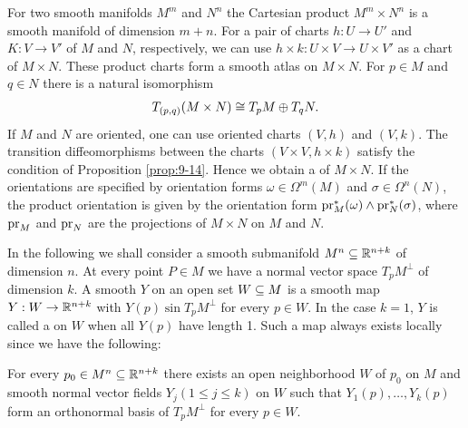 \begin{remark}\label{remark:9-20}
  For two smooth manifolds $M^m$ and $N^n$ the Cartesian product $M^m\times N^n$ is a smooth 
  manifold of dimension $m+n$. For a pair of charts $h:U\to U'$
  and $K:V\to V'$ of $M$ and $N$, respectively, we can use $h\times k:U\times V\to U\times V'$
  as a chart of $M\times N$. These product charts form a smooth atlas on $M\times N$. For
  $p\in M$ and $q\in N$ there is a natural isomorphism  
  \begin{align*}
    T_{(p, q)}(M\times N) \cong T_pM \oplus T_qN.
  \end{align*}
  If $M$ and $N$ are oriented, one can use oriented charts $(V, h)$ and $(V, k)$. The transition 
  diffeomorphisms between the charts $(V\times V , h\times k)$ satisfy the condition
  of Proposition \ref{prop:9-14}. Hence we obtain a  of $M\times N$. If the
  orientations are specified by orientation forms $\omega\in\Omega^m(M)$ and $\sigma\in\Omega^n(N)$, 
  the product orientation is given by the orientation form $\mathrm{pr}^*_M(\omega)\wedge\mathrm{pr}^*_N(\sigma)$, 
  where $\mathrm{pr}_M$ and $\mathrm{pr}_N$ are the projections of $M\times N$ on $M$ and $N$.
\end{remark}

In the following we shall consider a smooth submanifold $M^n\subseteq {\ensuremath{\mathbb{R}}}^{n+k}$ of
dimension $n$. At every point $P\in M$ we have a normal vector space $T_pM^\perp$ of 
dimension $k$. A smooth  $Y$ on an open set $W\subseteq M$ is a
smooth map $Y:W\to{\ensuremath{\mathbb{R}}}^{n+k}$ with $Y(p)\sin T_pM^\perp$ for every $p\in W$. In the case
$k = 1$, $Y$ is called a  on $W$ when all $Y(p)$ have length 1. Such a map
always exists locally since we have the following:

\begin{lemma}\label{lemma:9-21}
  For every $p_0\in M^n\subseteq {\ensuremath{\mathbb{R}}}^{n+k}$ there exists an open neighborhood
$W$ of $p_0$ on $M$ and smooth normal vector fields $Y_j(1\le j\le k)$ on $W$ such that
$Y_1(p), \ldots, Y_k(p)$ form an orthonormal basis of $T_pM^\perp$ for every $p\in W$.
\end{lemma}

